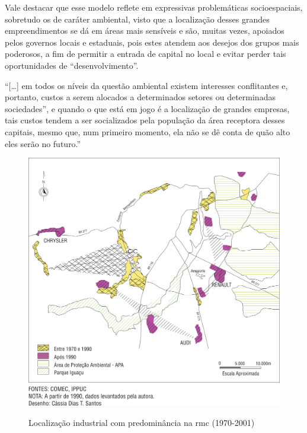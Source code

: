 	Vale destacar que esse modelo reflete em expressivas problemáticas socioespaciais, sobretudo os de caráter ambiental, visto que a localização desses grandes empreendimentos se dá em áreas mais sensíveis e são, muitas vezes, apoiados pelos governos locais e estaduais, pois estes atendem aos desejos dos grupos mais poderosos, a fim de permitir a entrada de capital no local e evitar perder tais oportunidades de “desenvolvimento”. 
	
	\begin{citacao}
		``[\dots] em todos os níveis da questão ambiental existem interesses conflitantes e, portanto, custos a serem alocados a determinados setores ou determinadas sociedades”, e quando o que está em jogo é a localização de grandes empresas, tais custos tendem a ser socializados pela população da área receptora desses capitais, mesmo que, num primeiro momento, ela não se dê conta de quão alto eles serão no futuro.'' 
	\end{citacao}

	\begin{figure}
		\centering
		\caption{Localização industrial com predominância na \gls{rmc} (1970-2001)}
		\includegraphics[width=1.0\linewidth]{img/firkowski2002b_01}
		\label{fig:firkowski2002b}
	\end{figure}

